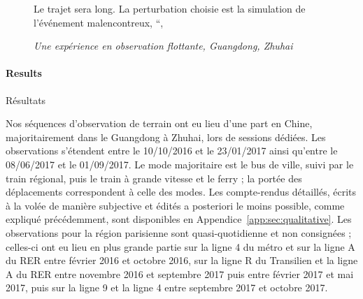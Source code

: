 \begin{figure}[h!]
\begin{mdframed}
Le trajet sera long. La perturbation choisie est la simulation de l'événement malencontreux, ``, 



\medskip

 \textit{Une expérience en observation flottante, Guangdong, Zhuhai}
\end{mdframed}
\end{figure}



\paragraph{Results}{Résultats}

Nos séquences d'observation de terrain ont eu lieu d'une part en Chine, majoritairement dans le Guangdong à Zhuhai, lors de sessions dédiées. Les observations s'étendent entre le 10/10/2016 et le 23/01/2017 ainsi qu'entre le 08/06/2017 et le 01/09/2017. Le mode majoritaire est le bus de ville, suivi par le train régional, puis le train à grande vitesse et le ferry ; la portée des déplacements correspondent à celle des modes. Les compte-rendus détaillés, écrits à la volée de manière subjective et édités a posteriori le moins possible, comme expliqué précédemment, sont disponibles en Appendice~\ref{app:sec:qualitative}. Les observations pour la région parisienne sont quasi-quotidienne et non consignées ; celles-ci ont eu lieu en plus grande partie sur la ligne 4 du métro et sur la ligne A du RER entre février 2016 et octobre 2016, sur la ligne R du Transilien et la ligne A du RER entre novembre 2016 et septembre 2017 puis entre février 2017 et mai 2017, puis sur la ligne 9 et la ligne 4 entre septembre 2017 et octobre 2017.














